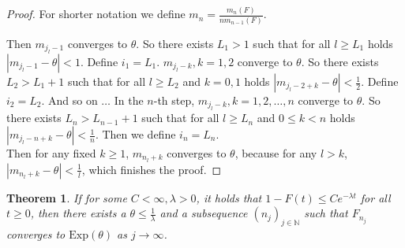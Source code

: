 \documentclass[12pt,a4paper]{scrartcl}
\newtheorem{theorem}{Theorem}[section]
\numberwithin{equation}{section}
\newcommand{\N}{\mathbb{N}} %
\begin{document}
\begin{proof}
For shorter notation we define $m_n = \frac{m_{n}\left(F\right)}{n m_{n-1}\left(F\right)}$.

Then $ m_{j_l - 1} $ converges to $\theta$. So there exists $L_1 > 1$ such that for all $l \geq L_1$ holds $\left|m_{j_l - 1} - \theta \right| < 1$. Define $i_1 = L_1$.\newline
$ m_{j_l - k} , k=1,2 $ converge to $\theta$. So there exists $L_2 > L_1 + 1$ such that for all $l \geq L_2$ and $k=0,1$ holds $\left|m_{j_l - 2+k} - \theta \right| < \frac{1}{2}$. Define $i_2 = L_2$.\newline
And so on $\ldots$\newline
In the $n$-th step, $ m_{j_l - k} , k=1,2,\ldots,n $ converge to $\theta$. So there exists $ L_n > L_{n-1} + 1 $ such that for all $l \geq L_n$ and $ 0 \leq k < n $ holds $\left|m_{j_l - n + k} - \theta \right| < \frac{1}{n}$. Then we define $i_n = L_n$.\\[1ex]

Then for any fixed $k \geq 1$, $m_{n_l + k}$ converges to $\theta$, because for any $l > k$, $ \left| m_{n_l+k} - \theta \right| < \frac{1}{l}$, which finishes the proof.


\end{proof}


\begin{theorem}
\label{Weneeditlater}
If for some $ C < \infty, \lambda > 0 $, it holds that $ 1- F\left(t\right) \leq Ce^{-\lambda t} $ for all $ t \geq 0 $, then there exists a $ \theta \leq \frac{1}{\lambda} $ and a subsequence $\left(n_j\right)_{j \in \N}$ such that $F_{n_j}$ converges to $\text{Exp}\left(\theta\right)$ as $ j \to \infty $.
\end{theorem}
\end{document}
